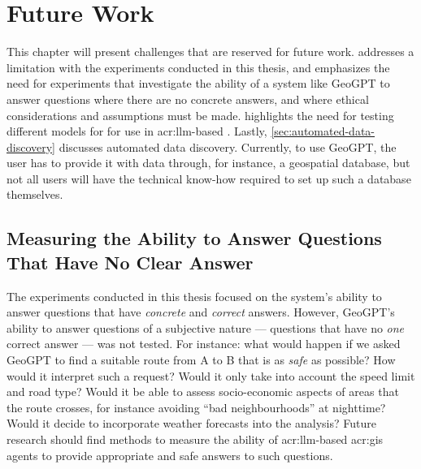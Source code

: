 \chapter{Future Work}
\label{cha:future-work}

\begin{comment}
Consider where you would like to extend or improve this work, or how somebody else could continue it.
These extensions might either be continuing the ongoing direction or taking a side direction that became obvious during the work.
Further, possible solutions to limitations in the work conducted, highlighted in Section~\ref{sec:discussion} may be presented.

Note that in the Specialisation Project Report, the Future Work section will be a key part of your plan for the novel work to be carried out in the next semester,
while in the Master's Thesis, the Future Work section rather will point to issues that others might be interested in addressing.
This can include options and alternatives that you did not try out yourself, or potential improvements and extensions to your experiments or system.
\end{comment}

This chapter will present challenges that are reserved for future work.  addresses a limitation with the experiments conducted in this thesis, and emphasizes the need for experiments that investigate the ability of a system like GeoGPT to answer questions where there are no concrete answers, and where ethical considerations and assumptions must be made.  highlights the need for testing different models for for use in \acrshort{acr:llm}-based . Lastly, \autoref{sec:automated-data-discovery} discusses automated data discovery. Currently, to use GeoGPT, the user has to provide it with data through, for instance, a geospatial database, but not all users will have the technical know-how required to set up such a database themselves.

\section{Measuring the Ability to Answer Questions That Have No Clear Answer}
\label{sec:no-clear-answer}

The experiments conducted in this thesis focused on the system's ability to answer questions that have \textit{concrete} and \textit{correct} answers. However, GeoGPT's ability to answer questions of a subjective nature --- questions that have no \textit{one} correct answer --- was not tested. For instance: what would happen if we asked GeoGPT to find a suitable route from A to B that is as \textit{safe} as possible? How would it interpret such a request? Would it only take into account the speed limit and road type? Would it be able to assess socio-economic aspects of areas that the route crosses, for instance avoiding \enquote{bad neighbourhoods} at nighttime? Would it decide to incorporate weather forecasts into the analysis? Future research should find methods to measure the ability of \acrshort{acr:llm}-based \acrshort{acr:gis} agents to provide appropriate and safe answers to such questions.

